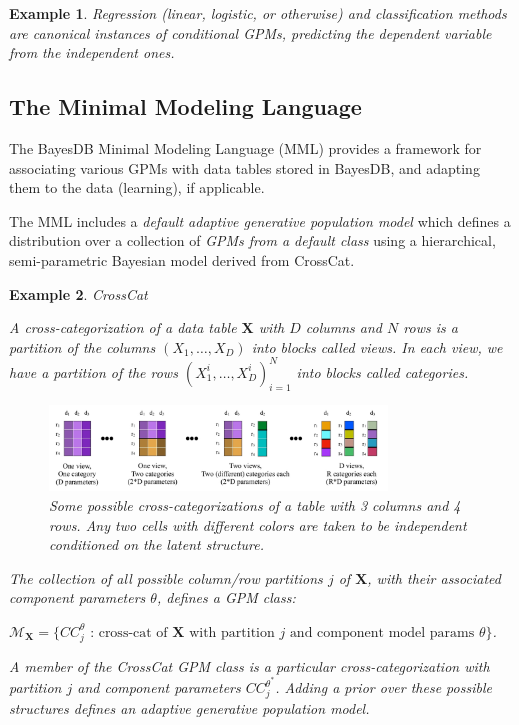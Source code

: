 \documentclass[10pt,letterpaper]{article}
\newtheorem{example}{Example}[section]
\newcommand{\set}[1]{\{#1\}}
\begin{document}
\begin{example}
Regression (linear, logistic, or otherwise) and classification methods
are canonical instances of conditional GPMs, predicting the dependent
variable from the independent ones.
\end{example}

\subsection{The Minimal Modeling Language}
\label{sec:mml}

The BayesDB Minimal Modeling Language (MML) provides a framework for
associating various GPMs with data tables stored in BayesDB, and
adapting them to the data (learning), if applicable.

The MML includes a \textit{default adaptive generative population
  model} which defines a distribution over a collection of
\textit{GPMs from a default class} using a hierarchical, semi-parametric
Bayesian model derived from CrossCat.

\begin{example} \label{ex:crosscat} CrossCat

A cross-categorization of a data table $\mathbf{X}$ with $D$ columns and $N$ 
rows is
a partition of the columns $(X_1,\dots,X_D)$ into blocks called \textit{views}.
In each view, we have a partition of the rows $(X_1^{i},\dots,X_D^{i})_{i=1}^N$
into blocks called \textit{categories}.

\begin{figure}[ht]
    \centering
\includegraphics[width=0.8\textwidth]{cc.jpeg}
\caption{Some possible cross-categorizations of a table with 3 columns
  and 4 rows.  Any two cells with different colors are taken to be
  independent conditioned on the latent structure.}
\label{fig:cc}
\end{figure}
The collection of all possible column/row partitions $j$ of
$\mathbf{X}$, with their associated component parameters $\theta$,
defines a GPM class:

$\mathcal{M}_\textbf{X} = \set{CC_j^{\theta} \text{ : cross-cat of } \mathbf{X}
\text{ with partition } j \text{ and component model params } \theta}$.

A member of the CrossCat GPM class is a particular
cross-categorization with partition $j$ and component parameters
$CC_j^{\theta^*}$.  Adding a prior over these possible structures
defines an adaptive generative population model.
\end{example}
\end{document}

